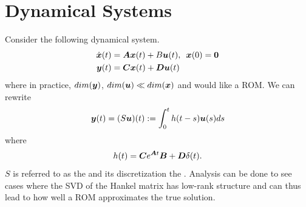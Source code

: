 
\section{Dynamical Systems}
Consider the following dynamical system.
\begin{align} \label{eqn:19:dynamical}
\dot{\boldsymbol{x}}(t) &= \boldsymbol{A} \boldsymbol{x}(t) + B \boldsymbol{u}(t),  \hspace{5pt} \boldsymbol{x}(0) = \boldsymbol{0} \\
\boldsymbol{y}(t) &= \boldsymbol{C} \boldsymbol{x}(t) + \boldsymbol{D} \boldsymbol{u}(t)
\end{align}
where in practice, $dim(\boldsymbol{y})$, $dim(\boldsymbol{u}) \ll dim(\boldsymbol{x})$ and would like a ROM. We can rewrite
\begin{align} \label{eqn:19:hankel}
\boldsymbol{y}(t) = (S\boldsymbol{u})(t) := \int_{0}^{t} h(t-s) \boldsymbol{u}(s) ds
\end{align}
where
\begin{align} \label{eqn:19:hankelkernel}
h(t) = \boldsymbol{C} e^{\boldsymbol{A} t} \boldsymbol{B} + \boldsymbol{D} \delta(t).
\end{align}
$S$ is referred to as the  and its discretization the . Analysis can be done to see cases where the SVD of the Hankel matrix has low-rank structure and can thus lead to how well a ROM approximates the true solution. 

